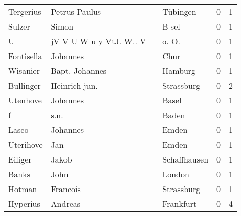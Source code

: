 \begin{tabular}{llllrr}
                Tergerius &                      Petrus Paulus &             &                                    Tübingen &          0 &         1 \\
                   Sulzer &                              Simon &             &                                       B sel &          0 &         1 \\
                        U &            jV V U W u y VtJ. W.. V &             &                                      o. O.  &          0 &         1 \\
               Fontisella &                           Johannes &             &                                        Chur &          0 &         1 \\
                 Wisanier &                     Bapt. Johannes &             &                                     Hamburg &          0 &         1 \\
                Bullinger &                      Heinrich jun. &             &                                  Strassburg &          0 &         2 \\
                 Utenhove &                           Johannes &             &                                       Basel &          0 &         1 \\
                        f &                               s.n. &             &                                       Baden &          0 &         1 \\
                    Lasco &                           Johannes &             &                                       Emden &          0 &         1 \\
                Uterihove &                                Jan &             &                                       Emden &          0 &         1 \\
                  Eiliger &                              Jakob &             &                                Schaffhausen &          0 &         1 \\
                    Banks &                               John &             &                                      London &          0 &         1 \\
                   Hotman &                           Francois &             &                                  Strassburg &          0 &         1 \\
                 Hyperius &                            Andreas &             &                                   Frankfurt &          0 &         4 \\

\end{tabular}
